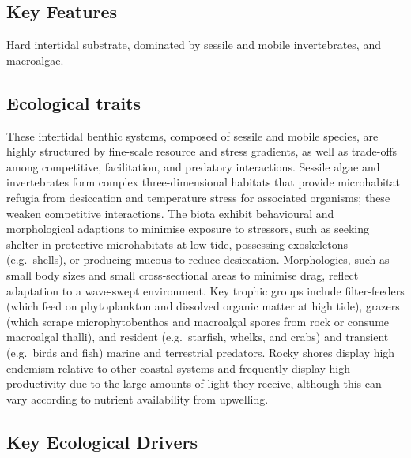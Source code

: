 \documentclass[
  letterpaper,
  DIV=11,
  numbers=noendperiod]{scrartcl}
\begin{document}
\subsection{Key Features}\label{key-features-52}

Hard intertidal substrate, dominated by sessile and mobile
invertebrates, and macroalgae.

\subsection{Ecological traits}\label{ecological-traits-52}

These intertidal benthic systems, composed of sessile and mobile
species, are highly structured by fine-scale resource and stress
gradients, as well as trade-offs among competitive, facilitation, and
predatory interactions. Sessile algae and invertebrates form complex
three-dimensional habitats that provide microhabitat refugia from
desiccation and temperature stress for associated organisms; these
weaken competitive interactions. The biota exhibit behavioural and
morphological adaptions to minimise exposure to stressors, such as
seeking shelter in protective microhabitats at low tide, possessing
exoskeletons (e.g.~shells), or producing mucous to reduce desiccation.
Morphologies, such as small body sizes and small cross-sectional areas
to minimise drag, reflect adaptation to a wave-swept environment. Key
trophic groups include filter-feeders (which feed on phytoplankton and
dissolved organic matter at high tide), grazers (which scrape
microphytobenthos and macroalgal spores from rock or consume macroalgal
thalli), and resident (e.g.~starfish, whelks, and crabs) and transient
(e.g.~birds and fish) marine and terrestrial predators. Rocky shores
display high endemism relative to other coastal systems and frequently
display high productivity due to the large amounts of light they
receive, although this can vary according to nutrient availability from
upwelling.

\subsection{Key Ecological Drivers}\label{key-ecological-drivers-52}
\end{document}
